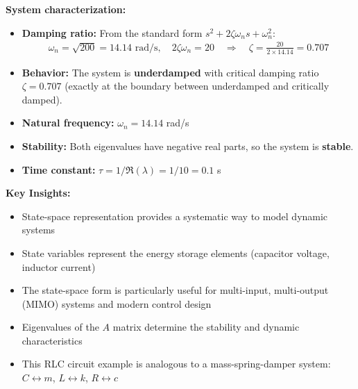 \documentclass[11pt,a4paper]{article}
\begin{document}
\textbf{System characterization:}
\begin{itemize}
  \item \textbf{Damping ratio:} From the standard form $s^2 + 2\zeta\omega_n s + \omega_n^2$:
    \begin{align}
      \omega_n = \sqrt{200} = 14.14 \text{ rad/s}, \quad 2\zeta\omega_n = 20 \quad \Rightarrow \quad \zeta = \frac{20}{2 \times 14.14} = 0.707
    \end{align}
  \item \textbf{Behavior:} The system is \textbf{underdamped} with critical damping ratio $\zeta = 0.707$ (exactly at the boundary between underdamped and critically damped).
  \item \textbf{Natural frequency:} $\omega_n = 14.14$ rad/s
  \item \textbf{Stability:} Both eigenvalues have negative real parts, so the system is \textbf{stable}.
  \item \textbf{Time constant:} $\tau = 1/\Re(\lambda) = 1/10 = 0.1$ s
\end{itemize}

\textbf{Key Insights:}
\begin{itemize}
  \item State-space representation provides a systematic way to model dynamic systems
  \item State variables represent the energy storage elements (capacitor voltage, inductor current)
  \item The state-space form is particularly useful for multi-input, multi-output (MIMO) systems and modern control design
  \item Eigenvalues of the $A$ matrix determine the stability and dynamic characteristics
  \item This RLC circuit example is analogous to a mass-spring-damper system: $C \leftrightarrow m$, $L \leftrightarrow k$, $R \leftrightarrow c$
\end{itemize}
\end{document}
